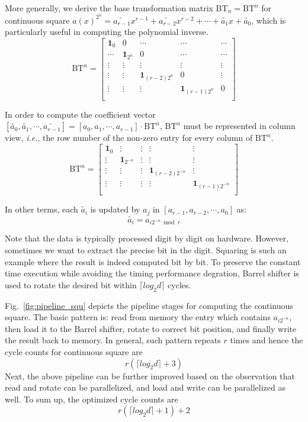 \documentclass[runningheads]{llncs}
\begin{document}
More generally, we derive the base transformation matrix $\text{BT}_n=\text{BT}^n$ for continuous square $a(x)^{2^n}=\widetilde{a_{r-1}}x^{r-1}+\widetilde{a_{r-2}}x^{r-2}+\cdots + \widetilde{a_{1}}x +\widetilde{a_0}$, which is particularly useful in computing the polynomial inverse.
\[
\text{BT}^n =
\left[ \begin{array}{ccccc}
\mathbf{1}_{0}&0&\cdots&\cdots&\cdots  \\
\cdots&\mathbf{1}_{2^n}&0 &\cdots&\cdots \\
\vdots&\vdots&\vdots&\vdots&\vdots\\
\vdots&\vdots&\mathbf{1}_{(r-2)2^n}&0&\vdots\\
\vdots&\vdots&\vdots&\mathbf{1}_{(r-1)2^n}&0\\
\end{array}
\right ]
\]

In order to compute the coefficient vector $[\widetilde{a_{0}},\widetilde{a_{1}},\cdots,\widetilde{a_{r-1}}]=[{a_{0}},{a_{1}},\cdots,{a_{r-1}}]
\cdot \text{BT}^n$, $\text{BT}^n$ must be represented in column view, \textit{i.e.},
the row number of the non-zero entry for every column of $\text{BT}^n$.
\[
\text{BT}^n =
\left[ \begin{array}{ccccc}
\mathbf{1}_{0}&\vdots& \vdots&\vdots&\vdots \\
\vdots&\mathbf{1}_{2^{-n}}&\vdots&\vdots&\vdots\\
\vdots&\vdots&\vdots&\mathbf{1}_{(r-2)2^{-n}}&\vdots\\
\vdots&\vdots&\vdots&\vdots&\mathbf{1}_{(r-1)2^{-n}}\\
\end{array}
\right ]
\]

In other terms, each $\widetilde{a_{i}}$ is updated by $a_{j}$ in $[{a_{r-1}},{a_{r-2}},\cdots,{a_0}]$ as:
\[
    \widetilde{a_{i}} = a_{i2^{-n}\bmod r}
\]

Note that the data is typically processed digit by digit on hardware. However, sometimes we want to extract the precise bit in the digit. Squaring is such an example where the result is indeed computed bit by bit. To preserve the constant time execution while avoiding the timing performance degration, Barrel shifter is used to rotate the desired bit within $\lceil log_2d\rceil$ cycles.

Fig.~\ref{fig:pipeline_squ} depicts the pipeline stages for computing the continuous square. The basic pattern is: read from memory the entry which contains $a_{i2^{-n}}$, then load it to the Barrel shifter, rotate to correct bit position, and finally write the result back to memory. In general, such pattern repeats $r$ times and hence the cycle counts for continuous square are
\[
    r(\lceil log_2d\rceil+3)
\]
Next, the above pipeline can be further improved based on the observation that read and rotate can be parallelized, and load and write can be parallelized as well. To sum up, the optimized cycle counts are
\[
    r(\lceil log_2d\rceil+1)+2
\]
\end{document}
